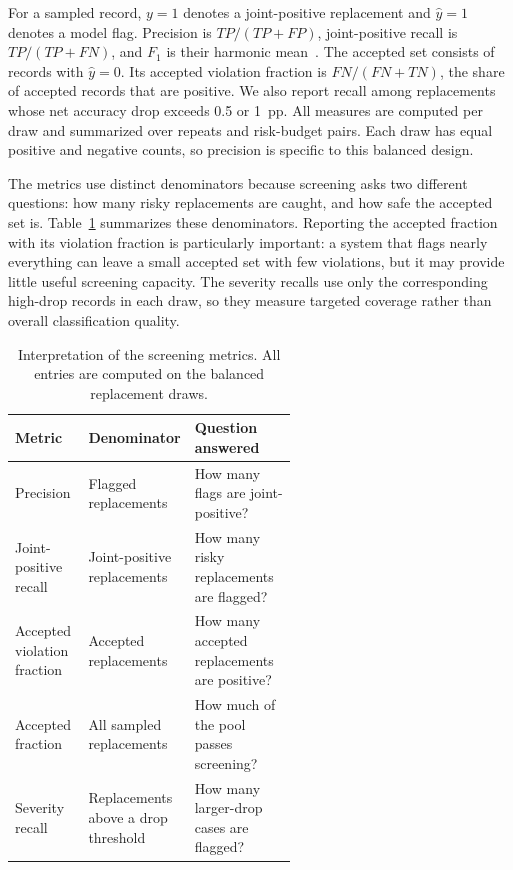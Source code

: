 \documentclass{article}
\begin{document}
For a sampled record, $y=1$ denotes a joint-positive replacement and $\hat y=1$ denotes a model flag. Precision is $TP/(TP+FP)$, joint-positive recall is $TP/(TP+FN)$, and $F_1$ is their harmonic mean~\citep{sokolova2009systematic}. The accepted set consists of records with $\hat y=0$. Its accepted violation fraction is $FN/(FN+TN)$, the share of accepted records that are positive. We also report recall among replacements whose net accuracy drop exceeds 0.5 or 1~pp. All measures are computed per draw and summarized over repeats and risk-budget pairs. Each draw has equal positive and negative counts, so precision is specific to this balanced design.

The metrics use distinct denominators because screening asks two different questions: how many risky replacements are caught, and how safe the accepted set is. Table~\ref{tab:metric-interpretation} summarizes these denominators. Reporting the accepted fraction with its violation fraction is particularly important: a system that flags nearly everything can leave a small accepted set with few violations, but it may provide little useful screening capacity. The severity recalls use only the corresponding high-drop records in each draw, so they measure targeted coverage rather than overall classification quality.

\begin{table}[t]
\centering
\caption{Interpretation of the screening metrics. All entries are computed on the balanced replacement draws.}
\label{tab:metric-interpretation}
\small
\begin{tabularx}{\linewidth}{>{\raggedright\arraybackslash}p{0.26\linewidth}>{\raggedright\arraybackslash}p{0.30\linewidth}>{\raggedright\arraybackslash}X}
\toprule
Metric & Denominator & Question answered \\
\midrule
Precision & Flagged replacements & How many flags are joint-positive? \\
Joint-positive recall & Joint-positive replacements & How many risky replacements are flagged? \\
Accepted violation fraction & Accepted replacements & How many accepted replacements are positive? \\
Accepted fraction & All sampled replacements & How much of the pool passes screening? \\
Severity recall & Replacements above a drop threshold & How many larger-drop cases are flagged? \\
\bottomrule
\end{tabularx}
\end{table}
\end{document}
